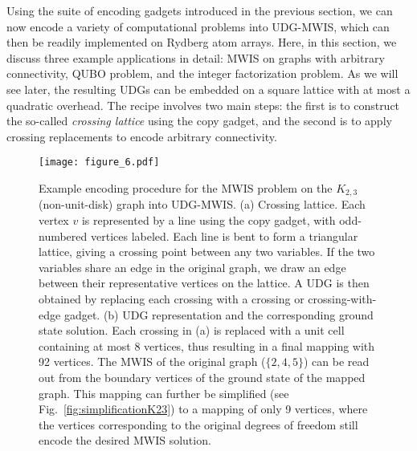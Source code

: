 Using the suite of encoding gadgets introduced in the previous section, we can now encode a variety of computational problems into UDG-MWIS, which can then be readily implemented on Rydberg atom arrays. Here, in this section, we discuss three example applications in detail: MWIS on graphs with arbitrary connectivity, QUBO problem, and the integer factorization problem. As we will see later, the resulting UDGs can be embedded on a square lattice with at most a quadratic overhead. The recipe involves two main steps: the first is to construct the so-called \textit{crossing lattice} using the copy gadget, and the second is to apply crossing replacements to encode arbitrary connectivity.


\begin{figure}[ht!]
    \texttt{[image: figure\_6.pdf]}
\caption{Example encoding procedure for the MWIS problem on the $K_{2,3}$ (non-unit-disk) graph into UDG-MWIS. (a) Crossing lattice. Each vertex $v$ is represented by a line using the copy gadget, with odd-numbered vertices labeled. Each line is bent to form a triangular lattice, giving a crossing point between any two variables. If the two variables share an edge in the original graph, we draw an edge between their representative vertices on the lattice. A UDG is then obtained by replacing each crossing with a crossing or crossing-with-edge gadget. (b) UDG representation and the corresponding ground state solution. Each crossing in (a) is replaced with a unit cell containing at most 8 vertices, thus resulting in a final mapping with 92 vertices. The MWIS of the original graph ($\{2, 4, 5\}$) can be read out from the boundary vertices of the ground state of the mapped graph. This mapping can further be simplified (see Fig.~\ref{fig:simplificationK23}) to a mapping of only 9 vertices, where the vertices corresponding to the original degrees of freedom still encode the desired MWIS solution.}
    \label{fig:MWIS}
\end{figure}

